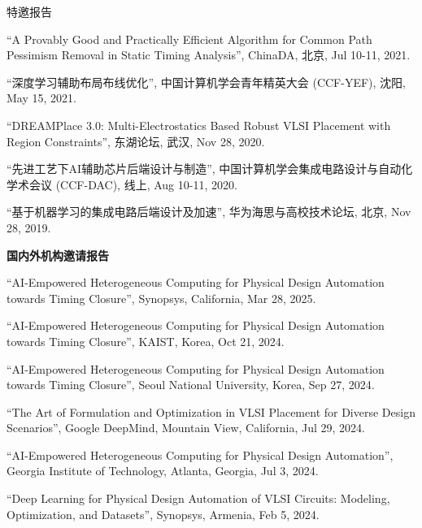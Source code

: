 \begin{rSection}{特邀报告}
\begin{description}[font=\normalfont]
\item[{[5]}]{
``A Provably Good and Practically Efficient Algorithm for Common Path Pessimism Removal in Static Timing Analysis'', ChinaDA, 北京, Jul 10-11, 2021. 
}

\item[{[4]}]{
``深度学习辅助布局布线优化'', 中国计算机学会青年精英大会 (CCF-YEF), 沈阳, May 15, 2021. 
}

\item[{[3]}]{
``DREAMPlace 3.0: Multi-Electrostatics Based Robust VLSI Placement with Region Constraints'', 东湖论坛, 武汉, Nov 28, 2020.
}

\item[{[2]}]{
``先进工艺下AI辅助芯片后端设计与制造'', 中国计算机学会集成电路设计与自动化学术会议 (CCF-DAC), 线上, Aug 10-11, 2020. 
}

\item[{[1]}]{
``基于机器学习的集成电路后端设计及加速'', 华为海思与高校技术论坛, 北京, Nov 28, 2019. 
}

\end{description}

\textbf{国内外机构邀请报告}
        
\begin{description}[font=\normalfont]

\item[{[14]}]{
``AI-Empowered Heterogeneous Computing for Physical Design Automation towards Timing Closure'', Synopsys, California, Mar 28, 2025. 
}

\item[{[13]}]{
``AI-Empowered Heterogeneous Computing for Physical Design Automation towards Timing Closure'', KAIST, Korea, Oct 21, 2024. 
}

\item[{[12]}]{
``AI-Empowered Heterogeneous Computing for Physical Design Automation towards Timing Closure'', Seoul National University, Korea, Sep 27, 2024. 
}

\item[{[11]}]{
``The Art of Formulation and Optimization in VLSI Placement for Diverse Design Scenarios'', Google DeepMind, Mountain View, California, Jul 29, 2024. 
}

\item[{[10]}]{
``AI-Empowered Heterogeneous Computing for Physical Design Automation'', Georgia Institute of Technology, Atlanta, Georgia, Jul 3, 2024. 
}

\item[{[9]}]{
``Deep Learning for Physical Design Automation of VLSI Circuits: Modeling, Optimization, and Datasets'', Synopsys, Armenia, Feb 5, 2024. 
}


\end{description}
\end{rSection}
